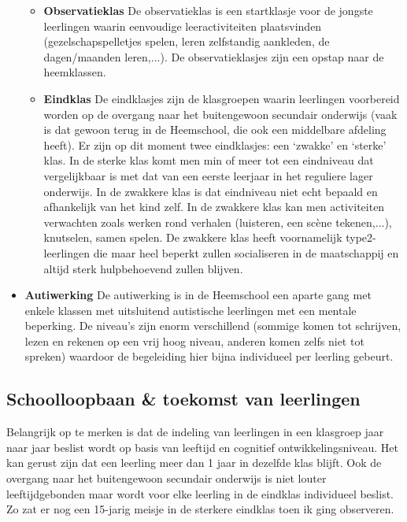 \documentclass[a4paper,11pt]{article}
\theoremstyle{definition}
\begin{document}
\begin{itemize}
\begin{itemize}
   \item  \textbf{Observatieklas}  De observatieklas is een startklasje voor de jongste 
   leerlingen waarin eenvoudige leeractiviteiten plaatsvinden (gezelschapspelletjes spelen, leren zelfstandig aankleden, de dagen/maanden 
   leren,...). De observatieklasjes zijn een opstap naar de heemklassen.
       \item \textbf{Eindklas} De eindklasjes zijn de klasgroepen waarin leerlingen 
    voorbereid worden op de overgang naar het buitengewoon secundair onderwijs (vaak is dat gewoon terug in de Heemschool, die ook een middelbare
    afdeling heeft). Er zijn op dit moment twee eindklasjes: een `zwakke' en 
    `sterke' klas. In de sterke klas komt men min of meer tot een eindniveau dat 
    vergelijkbaar is met dat van een eerste leerjaar in het reguliere lager 
    onderwijs. In de zwakkere klas is dat eindniveau niet echt bepaald en 
    afhankelijk van het kind zelf. In de zwakkere klas kan men activiteiten 
    verwachten zoals werken rond verhalen (luisteren, een scène tekenen,...), 
    knutselen, samen spelen. De zwakkere klas heeft voornamelijk type2-leerlingen die maar heel 
    beperkt zullen socialiseren in de maatschappij en altijd sterk hulpbehoevend 
    zullen blijven. 
   \end{itemize}
  
  \item \textbf{Autiwerking} De autiwerking is in de Heemschool een aparte gang met 
  enkele klassen met uitsluitend autistische leerlingen met een mentale beperking. De 
  niveau's zijn enorm verschillend (sommige komen tot schrijven, lezen en rekenen op een vrij hoog niveau, anderen komen zelfs niet tot 
  spreken) waardoor de begeleiding hier bijna individueel per leerling gebeurt. 
 
\end{itemize}
\subsection{Schoolloopbaan \& toekomst van leerlingen}
Belangrijk op te merken is dat de indeling van leerlingen in een klasgroep jaar 
naar jaar beslist wordt op basis van leeftijd en cognitief ontwikkelingsniveau. 
Het kan gerust zijn dat een leerling meer dan 1 jaar in dezelfde klas blijft. Ook 
de overgang naar het buitengewoon secundair onderwijs is niet louter leeftijdgebonden 
maar wordt voor elke leerling in de eindklas individueel beslist. Zo zat er nog een 
15-jarig meisje in de sterkere eindklas toen ik ging observeren. \\
\end{document}
